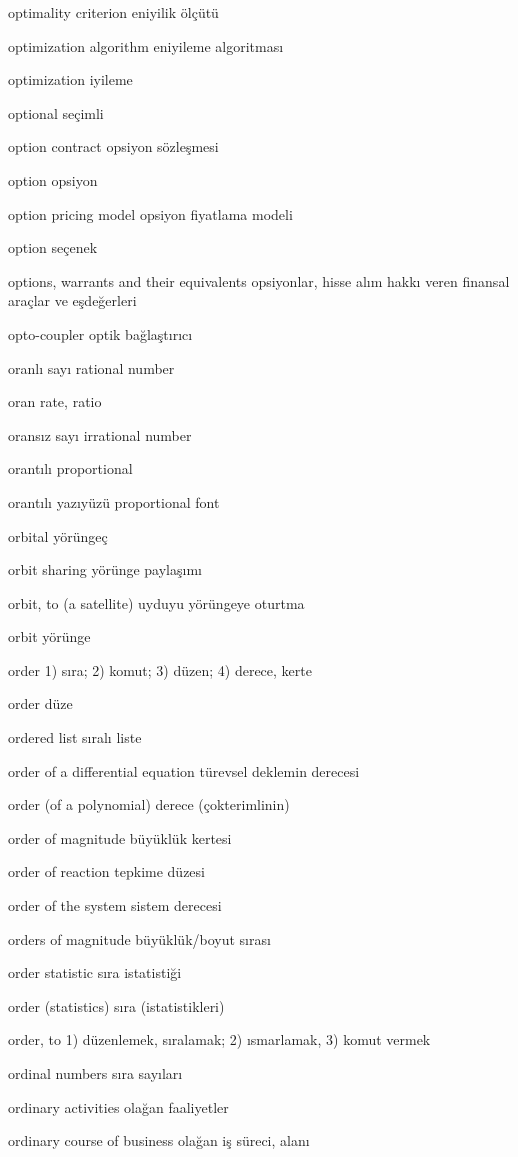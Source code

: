\documentclass[12pt,fleqn]{article}\usepackage{../../common}
\begin{document}
optimality criterion eniyilik ölçütü

optimization algorithm eniyileme algoritması

optimization iyileme

optional seçimli

option contract opsiyon sözleşmesi

option opsiyon

option pricing model opsiyon fiyatlama modeli

option seçenek

options, warrants and their equivalents opsiyonlar, hisse alım hakkı veren finansal araçlar ve eşdeğerleri

opto-coupler optik bağlaştırıcı

oranlı sayı rational number

oran rate, ratio

oransız sayı irrational number

orantılı proportional

orantılı yazıyüzü proportional font

orbital yörüngeç

orbit sharing yörünge paylaşımı

orbit, to (a satellite) uyduyu yörüngeye oturtma

orbit yörünge

order 1) sıra; 2) komut; 3) düzen; 4) derece, kerte

order düze

ordered list sıralı liste

order of a differential equation türevsel deklemin derecesi

order (of a polynomial) derece (çokterimlinin)

order of magnitude büyüklük kertesi

order of reaction tepkime düzesi

order of the system sistem derecesi

orders of magnitude büyüklük/boyut sırası

order statistic sıra istatistiği

order (statistics) sıra (istatistikleri)

order, to 1) düzenlemek, sıralamak; 2) ısmarlamak, 3) komut vermek

ordinal numbers sıra sayıları

ordinary activities olağan faaliyetler

ordinary course of business olağan iş süreci, alanı
\end{document}
